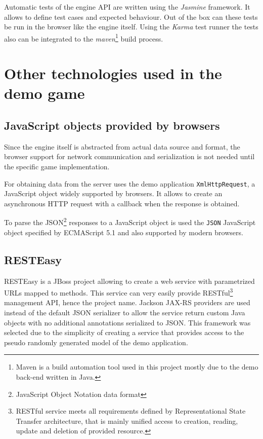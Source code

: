 \documentclass[11pt,oneside, final]{fithesis2}
\begin{document}
Automatic tests of the engine API are written using the \emph{Jasmine} framework. It allows to define test cases and expected behaviour\cite{jasmine}. Out of the box can these tests be run in the browser like the engine itself. Using the \emph{Karma} test runner the tests also can be integrated to the \emph{maven}\footnote{Maven is a build automation tool\cite{maven} used in this project mostly due to the demo back-end written in Java.} build process\cite{karma}.

\section{Other technologies used in the demo game}

\subsection{JavaScript objects provided by browsers}
Since the engine itself is abstracted from actual data source and format, the browser support for network communication and serialization is not needed until the specific game implementation.

For obtaining data from the server uses the demo application \texttt{XmlHttpRequest}, a JavaScript object widely supported by browsers\cite{xhr}. It allows to create an asynchronous HTTP request with a callback when the response is obtained.

To parse the JSON\footnote{JavaScript Object Notation data format} responses to a JavaScript object is used the \texttt{JSON} JavaScript object specified by ECMAScript 5.1 and also supported by modern browsers\cite{json}.

\subsection{RESTEasy}
RESTEasy is a JBoss project allowing to create a web service with parametrized URLs mapped to methods\cite{resteasy}. This service can very easily  provide RESTful\footnote{RESTful service meets all requirements defined by Representational State Transfer architecture, that is mainly unified access to creation, reading, update and deletion of provided resource\cite{fielding}.} management API, hence the project name. Jackson JAX-RS providers\cite{jackson} are used instead of the default JSON serializer to allow the service return custom Java objects with no additional annotations serialized to JSON. This framework was selected due to the simplicity of creating a service that provides access to the pseudo randomly generated model of the demo application.
\end{document}
